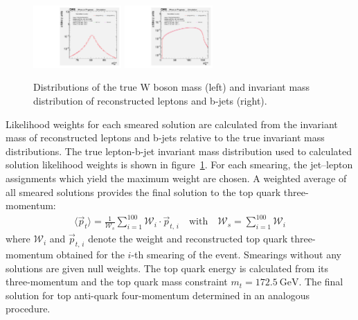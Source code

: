 \begin{figure}[!htb]
    \begin{center}
        \includegraphics[width=0.30\textwidth]{fig_fullRun2UL/SmearingPlots/ULcomp_KinReco_W_mass_step0.pdf}
        \includegraphics[width=0.30\textwidth]{fig_fullRun2UL/SmearingPlots/ULcomp_KinReco_mbl_true_step0.pdf}
        \caption{\small Distributions of the true W boson mass (left) and invariant mass distribution of reconstructed leptons and b-jets (right).}
       \label{fig:inputDists}
    \end{center}
\end{figure}

Likelihood weights for each smeared solution are calculated from the invariant mass of reconstructed leptons and b-jets relative to the true invariant mass distributions.
The true lepton-b-jet invariant mass distribution used to calculated solution likelihood weights is shown in figure~\ref{fig:inputDists}.
For each smearing, the jet--lepton assignments which yield the maximum weight are chosen.
A weighted average of all smeared solutions provides the final solution to the top quark three-momentum:
\begin{align}
\langle \vec{p}_{t} \rangle = \frac{1}{\mathcal{W}_s} \sum_{i=1}^{100} \mathcal{W}_i \cdot \vec{p}_{t,\,i} \quad \mbox{with} \quad \mathcal{W}_s = \sum_{i=1}^{100} \mathcal{W}_{i}
\end{align}
where $\mathcal{W}_i$ and $\vec{p}_{t,\,i}$ denote the weight and reconstructed top quark three-momentum obtained for the $i$-th smearing of the event.
Smearings without any solutions are given null weights.
The top quark energy is calculated from its three-momentum and the top quark mass constraint $m_{t} = \SI{172.5}{\GeV}$.
The final solution for top anti-quark four-momentum determined in an analogous procedure.

